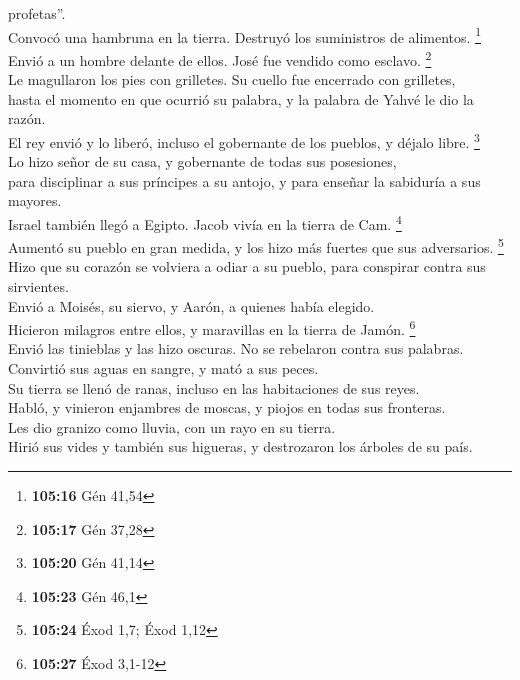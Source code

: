 profetas''.\\
 Convocó una hambruna en la tierra. Destruyó los
suministros de alimentos. \footnote{\textbf{105:16} Gén 41,54}\\
 Envió a un hombre delante de ellos. José fue vendido
como esclavo. \footnote{\textbf{105:17} Gén 37,28}\\
 Le magullaron los pies con grilletes. Su cuello fue
encerrado con grilletes,\\
 hasta el momento en que ocurrió su palabra, y la palabra
de Yahvé le dio la razón.\\
 El rey envió y lo liberó, incluso el gobernante de los
pueblos, y déjalo libre. \footnote{\textbf{105:20} Gén 41,14}\\
 Lo hizo señor de su casa, y gobernante de todas sus
posesiones,\\
 para disciplinar a sus príncipes a su antojo, y para
enseñar la sabiduría a sus mayores.\\
 Israel también llegó a Egipto. Jacob vivía en la tierra
de Cam. \footnote{\textbf{105:23} Gén 46,1}\\
 Aumentó su pueblo en gran medida, y los hizo más fuertes
que sus adversarios. \footnote{\textbf{105:24} Éxod 1,7; Éxod 1,12}\\
 Hizo que su corazón se volviera a odiar a su pueblo,
para conspirar contra sus sirvientes.\\
 Envió a Moisés, su siervo, y Aarón, a quienes había
elegido.\\
 Hicieron milagros entre ellos, y maravillas en la tierra
de Jamón. \footnote{\textbf{105:27} Éxod 3,1-12}\\
 Envió las tinieblas y las hizo oscuras. No se rebelaron
contra sus palabras.\\
 Convirtió sus aguas en sangre, y mató a sus peces.\\
 Su tierra se llenó de ranas, incluso en las habitaciones
de sus reyes.\\
 Habló, y vinieron enjambres de moscas, y piojos en todas
sus fronteras.\\
 Les dio granizo como lluvia, con un rayo en su tierra.\\
 Hirió sus vides y también sus higueras, y destrozaron
los árboles de su país.\\
